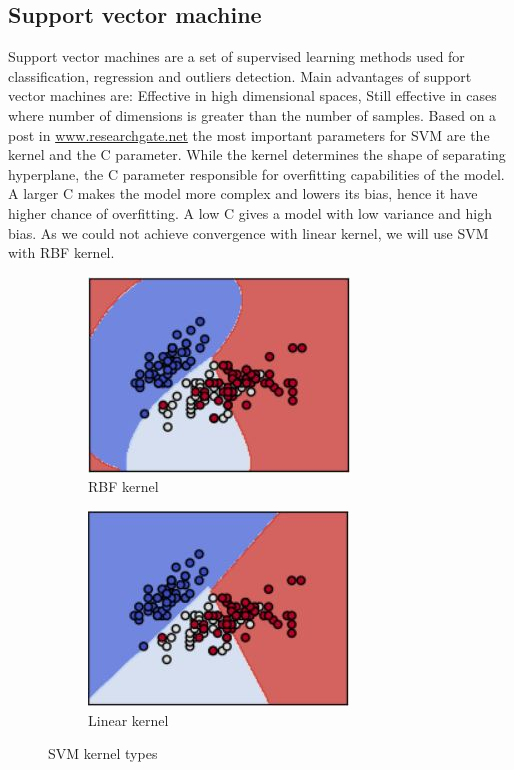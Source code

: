 \documentclass[12pt]{article}
\begin{document}
\subsection{Support vector machine}
Support vector machines are a set of supervised learning methods used for classification, regression and outliers detection. Main advantages of support vector machines are: Effective in high dimensional spaces, Still effective in cases where number of dimensions is greater than the number of samples. Based on a post in  \href{https://www.researchgate.net/post/Is_it_necessary_to_choose_kernels_in_SVM_according_to_application}{www.researchgate.net} the most important parameters for SVM are the kernel and the C parameter. While the kernel determines the shape of separating hyperplane, the C parameter responsible for overfitting capabilities of the model. A larger C makes the model more complex and lowers its bias, hence it have higher chance of overfitting. A low C gives a model with low variance and high bias. As we could not achieve convergence with linear kernel, we will use SVM with RBF kernel.

\begin{figure}[h]
\centering
\begin{subfigure}{.4\textwidth}
  \centering
  \includegraphics[width=.7\linewidth]{report_pics/SVM_RBF}
  \caption{RBF kernel}
  \label{fig:sub1}
\end{subfigure}%
\begin{subfigure}{.4\textwidth}
  \centering
  \includegraphics[width=.7\linewidth]{report_pics/SVM_linear}
  \caption{Linear kernel}
  \label{fig:sub2}
\end{subfigure}
\caption{SVM kernel types}
\label{fig:test}
\end{figure}
\end{document}
